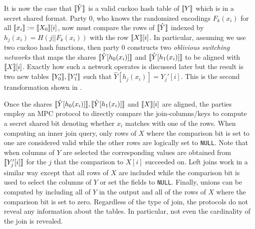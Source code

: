 It is now the case that $\llbracket \hat Y\rrbracket$ is a valid cuckoo hash table of $\llbracket Y\rrbracket$ which is in a secret shared format. Party 0, who knows the randomized encodings $F_k(x_i)$ for all $\llbracket  x_i\rrbracket:= \llbracket X_0\rrbracket[i]$, now must compare the rows of $\llbracket \hat Y\rrbracket$ indexed by $h_j(x_i)= H( j || F_k(x_i))$ with the row $\llbracket X\rrbracket[i]$. In particular, assuming we use two cuckoo hash functions, then party 0 constructs two \emph{oblivious switching networks} that maps the shares $\llbracket \hat Y[{h_0(x_i)}]\rrbracket$ and $\llbracket \hat Y[{h_1(x_i)}]\rrbracket$ to be aligned with $\llbracket X\rrbracket[i]$. Exactly how such a network operates is discussed later but the result is two new tables $\llbracket Y_0'\rrbracket,\llbracket Y_1'\rrbracket$ such that $\hat Y[{h_j(x_i)}]=Y_j'[i]$. This is the second transformation shown in .

Once the shares  $\llbracket \hat Y[{h_0(x_i)}]\rrbracket, \llbracket \hat Y[{h_1(x_i)}]\rrbracket$ and $\llbracket X\rrbracket[i]$ are aligned, the parties employ an MPC protocol to directly compare the join-columns/keys to compute a secret shared bit denoting whether $x_i$ matches with one of the rows. When computing an inner join query, only rows of $X$ where the comparison bit is set to one are considered valid while the other rows are logically set to \texttt{NULL}. Note that when columns of $Y$ are selected the corresponding values are obtained from $\llbracket Y_j'[i]\rrbracket$ for the $j$ that the comparison to $X[i]$ succeeded on. Left joins work in a similar way except that all rows of $X$ are included while the comparison bit is used to select the columns of $Y$ or set the fields to \texttt{NULL}. Finally, unions can be computed by including all of $Y$ in the output and all of the rows of $X$ where the comparison bit is set to zero. Regardless of the type of join, the protocols do not reveal any information about the tables. In particular, not even the cardinality of the join is revealed.

